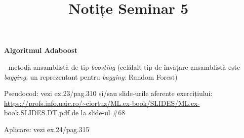 \documentclass[12pt]{article}
\title{%
	\textbf{Notițe Seminar 5}}
\begin{document}
	
	\maketitle
	
	\textbf{\large{Algoritmul Adaboost}}
	
	- metodă ansamblistă de tip \textit{boosting} (celălalt tip de învățare ansamblistă este \textit{bagging}; un reprezentant pentru \textit{bagging}: Random Forest)
	
	Pseudocod: vezi ex.23/pag.310 și/sau slide-urile aferente exercițiului: \url{https://profs.info.uaic.ro/~ciortuz/ML.ex-book/SLIDES/ML.ex-book.SLIDES.DT.pdf} de la slide-ul \#68
	
	Aplicare: vezi ex.24/pag.315
	
\end{document}
